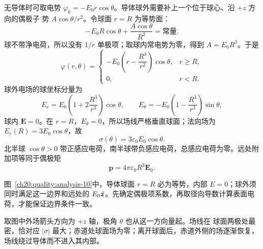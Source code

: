 {\begin{xesolution}
无导体时可取电势 $\varphi_0=-E_0r\cos\theta$。导体球外需要补上一个位于球心、沿 $+z$ 方向的偶极子
势 $A\cos\theta/r^2$。令球面 $r=R$ 为等势面：
\[
  -E_0R\cos\theta+\frac{A\cos\theta}{R^2}=\text{常量}.
\]
球不带净电荷，所以没有 $1/r$ 单极项；取球内常电势为零，得到 $A=E_0R^3$。于是
\[
  \boxed{\varphi(r,\theta)=
  \begin{cases}
    -E_0\left(r-\dfrac{R^3}{r^2}\right)\cos\theta,&r\ge R,\\[6pt]
    0,&r<R.
  \end{cases}}
\]
球外电场的球坐标分量为
\[
  \boxed{E_r=E_0\left(1+2\frac{R^3}{r^3}\right)\cos\theta,
  \qquad
  E_\theta=-E_0\left(1-\frac{R^3}{r^3}\right)\sin\theta},
\]
球内 $\boldsymbol E=0$。在 $r=R$，$E_\theta=0$，所以场线严格垂直球面；法向场为
$E_r(R)=3E_0\cos\theta$，故
\[
  \boxed{\sigma(\theta)=3\varepsilon_0E_0\cos\theta}.
\]
北半球 $\cos\theta>0$ 带正感应电荷，南半球带负感应电荷，总感应电荷为零。远处附加项等同于偶极矩
\[
  \boxed{\boldsymbol p=4\pi\varepsilon_0R^3\boldsymbol E_0}.
\]

\begin{qualityfigure}
\ThUniformSphereAnalysisDrawing
{}\label{ch20:quality:analysis-10}
\end{qualityfigure}
图~\ref{ch20:quality:analysis-10}中，导体球面 $r=R$ 必为等势，内部 $E=0$；球外须同时满足这一边界和远处的 $E_0\hat{\bm{z}}$。先确定偶极项系数，再取径向导数计算表面电荷，才能保证边界条件一致。


取图中外场箭头方向为 $+z$ 轴，极角 $\theta$ 也从这一方向量起。场线在
球面两极处最密，恰对应 $|\sigma|$ 最大；赤道处球面场为零；离开球面后，赤道外侧的场逐渐恢复，场线绕过导体而不进入其内部。
\end{xesolution}
}

